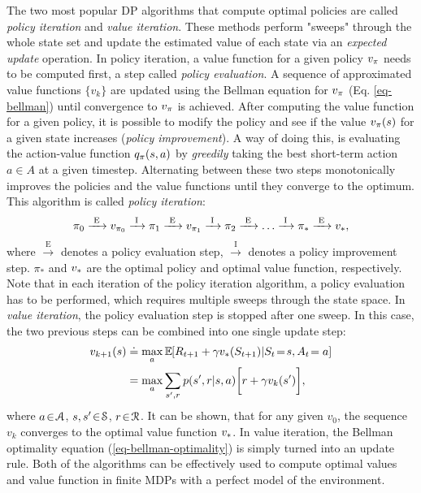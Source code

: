 \documentclass[a4paper, 12pt]{article}
\begin{document}
The two most popular DP algorithms that compute optimal policies are called
\emph{policy iteration} and \emph{value iteration}. These methods perform "sweeps" through
the whole state set and update the estimated value of each state via an
\emph{expected update} operation. In policy iteration, a value function for a given
policy \(\vpi\) needs to be computed first, a step called \emph{policy evaluation}. A
sequence of approximated value functions \(\{v_k\}\) are updated using the Bellman
equation for \(\vpi\) (Eq. \ref{eq-bellman}) until convergence to \(\vpi\) is
achieved. After computing the value function for a given policy, it is possible
to modify the policy and see if the value \(\vpi(s)\) for a given state increases
(\emph{policy improvement}). A way of doing this, is evaluating the action-value
function \(\qpi(s,a)\) by \emph{greedily} taking the best short-term action \(a\!\in\!A\)
at a given timestep. Alternating between these two steps monotonically improves
the policies and the value functions until they converge to the optimum. This
algorithm is called \emph{policy iteration}:
\begin{equation}
    \pi_0 \xrightarrow{\text{ E }} v_{\pi_0} \xrightarrow{\text{ I }}
    \pi_1 \xrightarrow{\text{ E }} v_{\pi_1} \xrightarrow{\text{ I }}
    \pi_2 \xrightarrow{\text{ E }} \hdots \xrightarrow{\text{ I }}
    \pi_* \xrightarrow{\text{ E }} \vstar,
\end{equation}
where \(\xrightarrow{\text{ E }}\) denotes a policy evaluation step,
\(\xrightarrow{\text{ I }}\) denotes a policy improvement step. \(\pi_*\) and
\(\vstar\) are the optimal policy and optimal value function, respectively. Note
that in each iteration of the policy iteration algorithm, a policy evaluation
has to be performed, which requires multiple sweeps through the state space. In
\emph{value iteration}, the policy evaluation step is stopped after one sweep. In
this case, the two previous steps can be combined into one single update step:
\begin{equation}
\begin{split}
    v_{k+1}(s) &\defeq \max_a \EE{}{R_{t+1}+\gamma \vstar(S_{t+1})|S_t\!=\!s, A_t\!=a} \\
    &= \max_{a}\sum_{s',r}{p(s',r|s,a)}\bigg[r+\gamma v_k(s')\bigg],
\end{split}
\end{equation}
where \(a\!\in\!\A\), \(s,s'\!\in\!\S\), \(r\!\in\!\R\). It can be shown, that for any
given \(v_0\), the sequence \({v_k}\) converges to the optimal value function
\({\vstar}\). In value iteration, the Bellman optimality equation
(\ref{eq-bellman-optimality}) is simply turned into an update rule. Both of the
algorithms can be effectively used to compute optimal values and value function
in finite MDPs with a perfect model of the environment.
\end{document}
